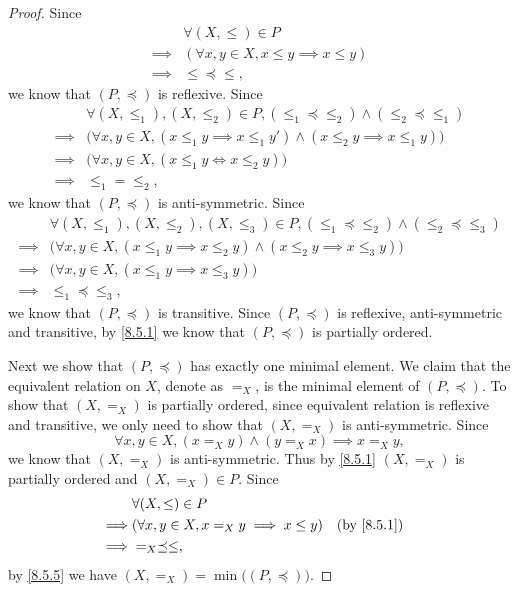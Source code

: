 \begin{proof}
  Since
  \begin{align*}
             & \forall (X, \leq) \in P                          \\
    \implies & (\forall x, y \in X, x \leq y \implies x \leq y) \\
    \implies & \leq \preceq \leq,
  \end{align*}
  we know that \((P, \preceq)\) is reflexive.
  Since
  \begin{align*}
             & \forall (X, \leq_1), (X, \leq_2) \in P, (\leq_1 \preceq \leq_2) \land (\leq_2 \preceq \leq_1)          \\
    \implies & \big(\forall x, y \in X, (x \leq_1 y \implies x \leq_1 y') \land (x \leq_2 y \implies x \leq_1 y)\big) \\
    \implies & \big(\forall x, y \in X, (x \leq_1 y \iff x \leq_2 y)\big)                                             \\
    \implies & \leq_1 = \leq_2,
  \end{align*}
  we know that \((P, \preceq)\) is anti-symmetric.
  Since
  \begin{align*}
             & \forall (X, \leq_1), (X, \leq_2), (X, \leq_3) \in P, (\leq_1 \preceq \leq_2) \land (\leq_2 \preceq \leq_3) \\
    \implies & \big(\forall x, y \in X, (x \leq_1 y \implies x \leq_2 y) \land (x \leq_2 y \implies x \leq_3 y)\big)      \\
    \implies & \big(\forall x, y \in X, (x \leq_1 y \implies x \leq_3 y)\big)                                             \\
    \implies & \leq_1 \preceq \leq_3,
  \end{align*}
  we know that \((P, \preceq)\) is transitive.
  Since \((P, \preceq)\) is reflexive, anti-symmetric and transitive, by \cref{8.5.1} we know that \((P, \preceq)\) is partially ordered.

  Next we show that \((P, \preceq)\) has exactly one minimal element.
  We claim that the equivalent relation on \(X\), denote as \(=_X\), is the minimal element of \((P, \preceq)\).
  To show that \((X, =_X)\) is partially ordered, since equivalent relation is reflexive and transitive, we only need to show that \((X, =_X)\) is anti-symmetric.
  Since
  \[
    \forall x, y \in X, (x =_X y) \land (y =_X x) \implies x =_X y,
  \]
  we know that \((X, =_X)\) is anti-symmetric.
  Thus by \cref{8.5.1} \((X, =_X)\) is partially ordered and \((X, =_X) \in P\).
  Since
  \begin{align*}
             & \forall (X, \leq) \in P                                         \\
    \implies & (\forall x, y \in X, x =_X y \implies x \leq y) &  & \by{8.5.1} \\
    \implies & =_X \preceq \leq,
  \end{align*}
  by \cref{8.5.5} we have \((X, =_X) = \min\big((P, \preceq)\big)\).


\end{proof}
